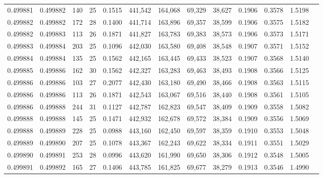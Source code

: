 \begin{tabular}{rrrrrrrrrrrrr}
0.499881 & 0.499882 & 140 &  25 &                                     0.1515 & 441,542 & 164,068 &  69,329 &  38,627 & 0.1906 & 0.3578 & 1.5198 \\
0.499882 & 0.499882 & 172 &  28 &                                     0.1400 & 441,714 & 163,896 &  69,357 &  38,599 & 0.1906 & 0.3575 & 1.5182 \\
0.499882 & 0.499883 & 113 &  26 &                                     0.1871 & 441,827 & 163,783 &  69,383 &  38,573 & 0.1906 & 0.3573 & 1.5171 \\
0.499883 & 0.499884 & 203 &  25 &                                     0.1096 & 442,030 & 163,580 &  69,408 &  38,548 & 0.1907 & 0.3571 & 1.5152 \\
0.499884 & 0.499884 & 135 &  25 &                                     0.1562 & 442,165 & 163,445 &  69,433 &  38,523 & 0.1907 & 0.3568 & 1.5140 \\
0.499885 & 0.499886 & 162 &  30 &                                     0.1562 & 442,327 & 163,283 &  69,463 &  38,493 & 0.1908 & 0.3566 & 1.5125 \\
0.499886 & 0.499886 & 103 &  27 &                                     0.2077 & 442,430 & 163,180 &  69,490 &  38,466 & 0.1908 & 0.3563 & 1.5115 \\
0.499886 & 0.499886 & 113 &  26 &                                     0.1871 & 442,543 & 163,067 &  69,516 &  38,440 & 0.1908 & 0.3561 & 1.5105 \\
0.499886 & 0.499888 & 244 &  31 &                                     0.1127 & 442,787 & 162,823 &  69,547 &  38,409 & 0.1909 & 0.3558 & 1.5082 \\
0.499888 & 0.499888 & 145 &  25 &                                     0.1471 & 442,932 & 162,678 &  69,572 &  38,384 & 0.1909 & 0.3556 & 1.5069 \\
0.499888 & 0.499889 & 228 &  25 &                                     0.0988 & 443,160 & 162,450 &  69,597 &  38,359 & 0.1910 & 0.3553 & 1.5048 \\
0.499889 & 0.499890 & 207 &  25 &                                     0.1078 & 443,367 & 162,243 &  69,622 &  38,334 & 0.1911 & 0.3551 & 1.5029 \\
0.499890 & 0.499891 & 253 &  28 &                                     0.0996 & 443,620 & 161,990 &  69,650 &  38,306 & 0.1912 & 0.3548 & 1.5005 \\
0.499891 & 0.499892 & 165 &  27 &                                     0.1406 & 443,785 & 161,825 &  69,677 &  38,279 & 0.1913 & 0.3546 & 1.4990 \\

\end{tabular}
